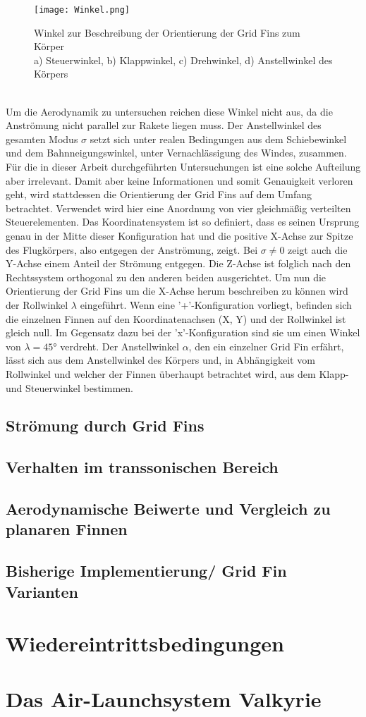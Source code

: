 \begin{figure}[h]
	\centering
	\texttt{[image: Winkel.png]}
	\caption{Winkel zur Beschreibung der Orientierung der Grid Fins zum Körper\\a) Steuerwinkel, b) Klappwinkel, c) Drehwinkel, d) Anstellwinkel des Körpers}
	\label{abb_winkel}
\end{figure}\\
Um die Aerodynamik zu untersuchen reichen diese Winkel nicht aus, da die Anströmung nicht parallel zur Rakete liegen muss. Der Anstellwinkel des gesamten Modus $\sigma$ setzt sich unter realen Bedingungen aus dem Schiebewinkel und dem Bahnneigungswinkel, unter Vernachlässigung des Windes, zusammen. Für die in dieser Arbeit durchgeführten Untersuchungen ist eine solche Aufteilung aber irrelevant. Damit aber keine Informationen und somit Genauigkeit verloren geht, wird stattdessen die Orientierung der Grid Fins auf dem Umfang betrachtet. Verwendet wird hier eine Anordnung von vier gleichmäßig verteilten Steuerelementen. Das Koordinatensystem ist so definiert, dass es seinen Ursprung genau in der Mitte dieser Konfiguration hat und die positive X-Achse zur Spitze des Flugkörpers, also entgegen der Anströmung, zeigt. Bei $\sigma \neq 0$ zeigt auch die Y-Achse einem Anteil der Strömung entgegen. Die Z-Achse ist folglich nach den Rechtssystem orthogonal zu den anderen beiden ausgerichtet. Um nun die Orientierung der Grid Fins um die X-Achse herum beschreiben zu können wird der Rollwinkel $\lambda$ eingeführt. Wenn eine '+'-Konfiguration vorliegt, befinden sich die einzelnen Finnen auf den Koordinatenachsen (X, Y) und der Rollwinkel ist gleich null. Im Gegensatz dazu bei der 'x'-Konfiguration sind sie um einen Winkel von $\lambda = 45°$ verdreht. Der Anstellwinkel $\alpha$, den ein einzelner Grid Fin erfährt, lässt sich aus dem Anstellwinkel des Körpers und, in Abhängigkeit vom Rollwinkel und welcher der Finnen überhaupt betrachtet wird, aus dem Klapp- und Steuerwinkel bestimmen.
\subsection{Strömung durch Grid Fins}

\subsection{Verhalten im transsonischen Bereich}
\subsection{Aerodynamische Beiwerte und Vergleich zu planaren Finnen}
\subsection{Bisherige Implementierung/ Grid Fin Varianten}

\section{Wiedereintrittsbedingungen}

\section{Das Air-Launchsystem Valkyrie}

